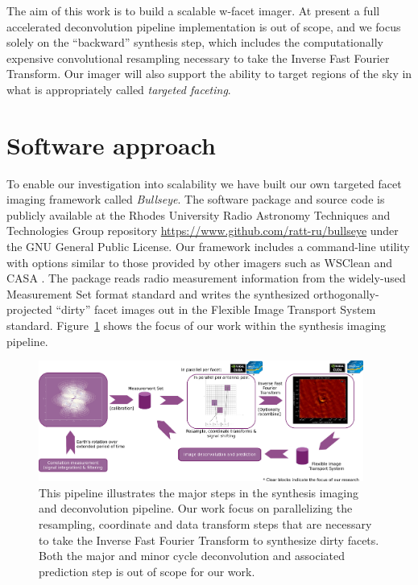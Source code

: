 The aim of this work is to build a scalable w-facet imager. At present a full accelerated deconvolution pipeline implementation is out of scope, and we focus solely on the ``backward'' synthesis step,
which includes the computationally expensive convolutional resampling necessary to take the Inverse Fast Fourier Transform. Our imager will also support the ability to target regions of the sky in what is
appropriately called \textit{targeted faceting}.

\section{Software approach}
To enable our investigation into scalability we have built our own targeted facet imaging framework called \textit{Bullseye}. The software package and source code is publicly available at the Rhodes University Radio Astronomy 
Techniques and Technologies Group repository \url{https://www.github.com/ratt-ru/bullseye} under the GNU General Public License. Our framework includes a command-line utility with options similar to those provided by other imagers such 
as WSClean \cite{offringa2014wsclean} and CASA \cite{jaeger2008common,mcmullin2007casa}. The package reads radio measurement information from the widely-used Measurement Set \cite{ms10,ms20} format standard and writes the synthesized 
orthogonally-projected ``dirty'' facet images out in the Flexible Image Transport System \cite{pence2010definition,calabretta2002representations} standard. Figure~\ref{fig_aims_pipeline} shows the focus of our work
within the synthesis imaging pipeline.
\begin{figure}
 \begin{mdframed}
  \centering
  \includegraphics[width=0.95\textwidth]{images/aims_process.png}
  \caption[Aims of the work in this thesis and position in synthesis pipeline.]{This pipeline illustrates the major steps in the synthesis imaging and deconvolution pipeline. Our work focus on parallelizing the resampling,
	  coordinate and data transform steps that are necessary to take the Inverse Fast Fourier Transform to synthesize dirty facets. Both the major and minor cycle deconvolution and associated prediction step is out of scope for our work.}
  \label{fig_aims_pipeline}
 \end{mdframed}
\end{figure}

